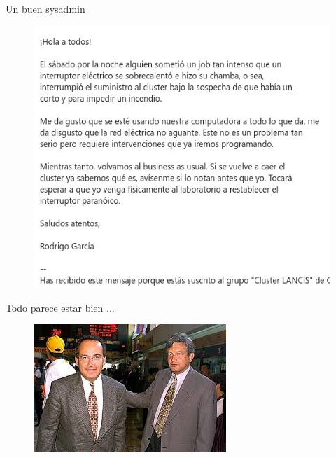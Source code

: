 \documentclass[11pt]{beamer}
\begin{document}
\begin{frame}{Un buen sysadmin}
	\begin{figure}
		\includegraphics[scale=1.8]{images/rodrigo_lancis	}
	\end{figure}
\end{frame}

\begin{frame}{Todo parece estar bien ... }
	\begin{figure}
		\includegraphics[scale=0.8]{images/armonia_cuatro	}
	\end{figure}
\end{frame}
\end{document}
